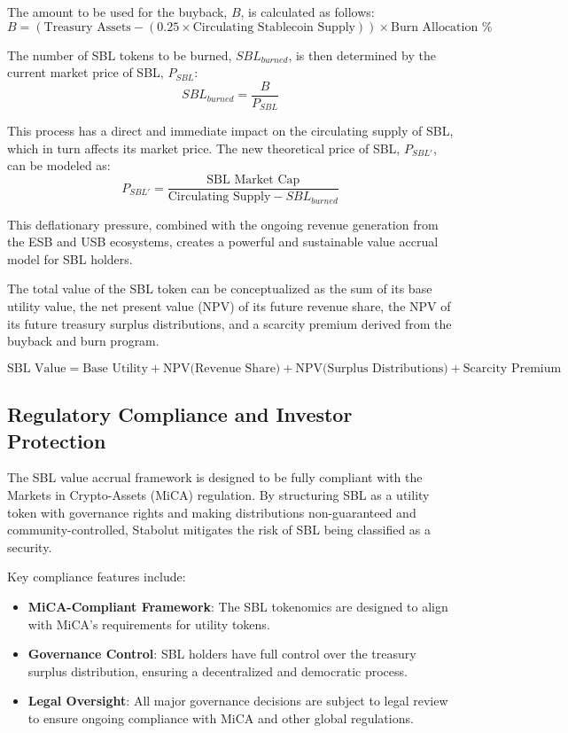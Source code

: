 The amount to be used for the buyback, $B$, is calculated as follows:
\begin{equation}
B = (\text{Treasury Assets} - (0.25 \times \text{Circulating Stablecoin Supply})) \times \text{Burn Allocation \%}
\end{equation}


The number of SBL tokens to be burned, $SBL_{burned}$, is then determined by the current market price of SBL, $P_{SBL}$:
\begin{equation}
SBL_{burned} = \frac{B}{P_{SBL}}
\end{equation}

This process has a direct and immediate impact on the circulating supply of SBL, which in turn affects its market price. The new theoretical price of SBL, $P_{SBL'}$, can be modeled as:
\begin{equation}
P_{SBL'} = \frac{\text{SBL Market Cap}}{\text{Circulating Supply} - SBL_{burned}}
\end{equation}

This deflationary pressure, combined with the ongoing revenue generation from the ESB and USB ecosystems, creates a powerful and sustainable value accrual model for SBL holders.

The total value of the SBL token can be conceptualized as the sum of its base utility value, the net present value (NPV) of its future revenue share, the NPV of its future treasury surplus distributions, and a scarcity premium derived from the buyback and burn program.

\begin{equation}
\text{SBL Value} = \text{Base Utility} + \text{NPV(Revenue Share)} + \text{NPV(Surplus Distributions)} + \text{Scarcity Premium}
\end{equation}


\subsection{Regulatory Compliance and Investor Protection}

The SBL value accrual framework is designed to be fully compliant with the Markets in Crypto-Assets (MiCA) regulation. By structuring SBL as a utility token with governance rights and making distributions non-guaranteed and community-controlled, Stabolut mitigates the risk of SBL being classified as a security.

Key compliance features include:
\begin{itemize}
    \item \textbf{MiCA-Compliant Framework}: The SBL tokenomics are designed to align with MiCA's requirements for utility tokens.
    \item \textbf{Governance Control}: SBL holders have full control over the treasury surplus distribution, ensuring a decentralized and democratic process.
    \item \textbf{Legal Oversight}: All major governance decisions are subject to legal review to ensure ongoing compliance with MiCA and other global regulations.
\end{itemize}


